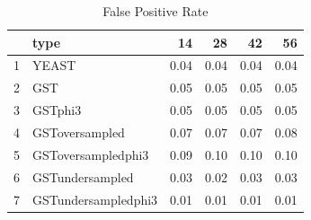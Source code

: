 \begin{table}[ht]
\caption{False Positive Rate}\label{tbl:appendixFPR}
\centering
\begin{small}
\begin{tabular}{rlrrrr}
  \hline
  & type & 14 & 28 & 42 & 56 \\
  \hline
  1 & YEAST & 0.04 & 0.04 & 0.04 & 0.04 \\
  2 & GST & 0.05 & 0.05 & 0.05 & 0.05 \\
  3 & GSTphi3 & 0.05 & 0.05 & 0.05 & 0.05 \\
  4 & GSToversampled & 0.07 & 0.07 & 0.07 & 0.08 \\
  5 & GSToversampledphi3 & 0.09 & 0.10 & 0.10 & 0.10 \\
  6 & GSTundersampled & 0.03 & 0.02 & 0.03 & 0.03 \\
  7 & GSTundersampledphi3 & 0.01 & 0.01 & 0.01 & 0.01 \\
   \hline
\end{tabular}
\end{small}
\end{table}
